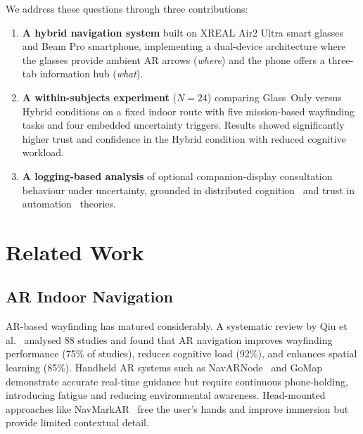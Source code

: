 \documentclass[review]{vgtc}           %
\begin{document}
We address these questions through three contributions:

\begin{enumerate}
\item \textbf{A hybrid navigation system} built on XREAL Air2 Ultra
smart glasses and Beam Pro smartphone, implementing a dual-device
architecture where the glasses provide ambient AR arrows (\emph{where})
and the phone offers a three-tab information hub (\emph{what}).

\item \textbf{A within-subjects experiment} ($N{=}24$) comparing
Glass~Only versus Hybrid conditions on a fixed indoor route with
five mission-based wayfinding tasks and four embedded uncertainty
triggers. Results showed significantly higher trust and confidence in the
Hybrid condition with reduced cognitive workload.

\item \textbf{A logging-based analysis} of optional companion-display
consultation behaviour under uncertainty, grounded in distributed
cognition~\cite{Hutchins:1995:CIW} and trust in
automation~\cite{Lee:2004:TAS} theories.
\end{enumerate}



\section{Related Work}

\subsection{AR Indoor Navigation}

AR-based wayfinding has matured considerably. A systematic review by
Qiu et al.~\cite{Qiu:2025:UAR} analysed 88 studies and found that AR
navigation improves wayfinding performance (75\% of studies), reduces
cognitive load (92\%), and enhances spatial learning (85\%). Handheld
AR systems such as NavARNode~\cite{Putra:2025:AAN} and
GoMap~\cite{Sharin:2023:GCS} demonstrate accurate real-time guidance
but require continuous phone-holding, introducing fatigue and reducing
environmental awareness. Head-mounted approaches like
NavMarkAR~\cite{Hsu:2023:NAL} free the user's hands and improve
immersion but provide limited contextual detail.
\end{document}
